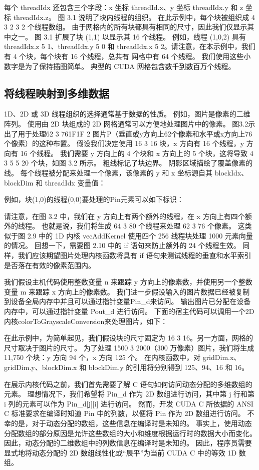 每个 threadIdx 还包含三个字段：x 坐标 threadId.x、y 坐标 threadIdx.y 和 z 坐标 threadIdx.z。 图 3.1 说明了块内线程的组织。 在此示例中，每个块被组织成 4 3 2 3 2 个线程数组。 由于网格内的所有块都具有相同的尺寸，因此我们仅显示其中之一。 图 3.1 扩展了块 (1,1) 以显示其 16 个线程。 例如，线程 (1,0,2) 具有 threadIdx.z 5 1、threadIdx.y 5 0 和 threadIdx.x 5 2。请注意，在本示例中，我们有 4 个块，每个块有 16 个线程，总共有 网格中有 64 个线程。 我们使用这些小数字是为了保持插图简单。 典型的 CUDA 网格包含数千到数百万个线程。

\subsection{将线程映射到多维数据}
1D、2D 或 3D 线程组织的选择通常基于数据的性质。 例如，图片是像素的二维阵列。 使用由 2D 块组成的 2D 网格通常可以方便地处理图片中的像素。 图3.2示出了用于处理62 3 761F1F 2 图片P（垂直或y方向上62个像素和水平或x方向上76个像素）的这种布置。 假设我们决定使用 16 3 16 块，x 方向有 16 个线程，y 方向有 16 个线程。 我们需要 y 方向上的 4 个块和 x 方向上的 5 个块，这将导致 4 3 5 5 20 个块，如图 3.2 所示。 粗线标记了块边界。 阴影区域描绘了覆盖像素的线。 每个线程被分配来处理一个像素，该像素的 y 和 x 坐标源自其 blockIdx、blockDim 和 threadIdx 变量值：

例如，块(1,0)的线程(0,0)要处理的Pin元素可以如下标识：

请注意，在图 3.2 中，我们在 y 方向上有两个额外的线程，在 x 方向上有四个额外的线程。 也就是说，我们将生成 64 3 80 个线程来处理 62 3 76 个像素。 这类似于图 2.9 中的 1D 内核 vecAddKernel 使用四个 256 线程块处理 1000 元素向量的情况。 回想一下，需要图 2.10 中的 if 语句来防止额外的 24 个线程生效。 同样，我们应该期望图片处理内核函数将具有 if 语句来测试线程的垂直和水平索引是否落在有效的像素范围内。

我们假设主机代码使用整数变量 n 来跟踪 y 方向上的像素数，并使用另一个整数变量 m 来跟踪 x 方向上的像素数。 我们进一步假设输入的图片数据已经被复制到设备全局内存中并且可以通过指针变量Pin\_d来访问。 输出图片已分配在设备内存中，可以通过指针变量 Pout\_d 进行访问。 下面的宿主代码可以调用一个2D内核colorToGrayscaleConversion来处理图片，如下：

在此示例中，为简单起见，我们假设块的尺寸固定为 16 3 16。另一方面，网格的尺寸取决于图片的尺寸。 为了处理 1500 3 2000（300 万像素）图片，我们将生成 11,750 个块：y 方向 94 个，x 方向 125 个。 在内核函数中，对 gridDim.x、gridDim.y、blockDim.x 和 blockDim.y 的引用将分别得到 125、94、16 和 16。

在展示内核代码之前，我们首先需要了解 C 语句如何访问动态分配的多维数组的元素。 理想情况下，我们希望将 Pin\_d 作为 2D 数组进行访问，其中第 j 行和第 i 列的元素可以作为 Pin\_d[j][i] 进行访问。 然而，开发 CUDA C 所依据的 ANSI C 标准要求在编译时知道 Pin 中的列数，以便将 Pin 作为 2D 数组进行访问。 不幸的是，对于动态分配的数组，这些信息在编译时是未知的。 事实上，使用动态分配数组的部分原因是允许这些数组的大小和维度根据运行时的数据大小而变化。 因此，动态分配的二维数组中的列数信息在编译时是未知的。 因此，程序员需要显式地将动态分配的 2D 数组线性化或“展平”为当前 CUDA C 中的等效 1D 数组。

